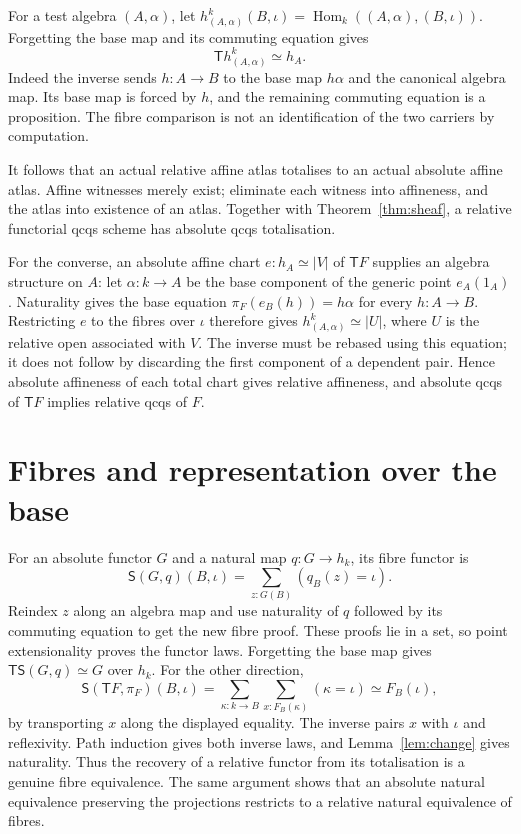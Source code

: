 \documentclass[11pt]{amsart}
\theoremstyle{definition}\newtheorem{definition}[theorem]{Definition}
\newcommand{\Hom}{\operatorname{Hom}}
\begin{document}
For a test algebra $(A,\alpha)$, let
$h^k_{(A,\alpha)}(B,\iota)=\Hom_k((A,\alpha),(B,\iota))$.
Forgetting the base map and its commuting equation gives
\begin{equation}\label{eq:affine}
 \mathsf T h^k_{(A,\alpha)}\simeq h_A.
\end{equation}
Indeed the inverse sends $h:A\to B$ to the base map $h\alpha$ and
the canonical algebra map. Its base map is forced by $h$, and the
remaining commuting equation is a proposition. The fibre comparison is
not an identification of the two carriers by computation.

It follows that an actual relative affine atlas totalises to an actual
absolute affine atlas. Affine witnesses merely exist; eliminate each
witness into affineness, and the atlas into existence of an atlas.
Together with Theorem~\ref{thm:sheaf}, a relative functorial qcqs scheme
has absolute qcqs totalisation.

For the converse, an absolute affine chart $e:h_A\simeq|V|$ of
$\mathsf T F$ supplies an algebra structure on $A$: let $\alpha:k\to A$
be the base component of the generic point $e_A(1_A)$.
Naturality gives the base equation
$\pi_F(e_B(h))=h\alpha$ for every $h:A\to B$.
Restricting $e$ to the fibres over $\iota$ therefore gives
$h^k_{(A,\alpha)}\simeq|U|$, where $U$ is the relative open associated
with $V$. The inverse must be rebased using this equation; it does not
follow by discarding the first component of a dependent pair.
Hence absolute affineness of each total chart gives relative affineness,
and absolute qcqs of $\mathsf T F$ implies relative qcqs of $F$.

\section{Fibres and representation over the base}
For an absolute functor $G$ and a natural map $q:G\to h_k$, its fibre
functor is
\[
 \mathsf S(G,q)(B,\iota)=\sum_{z:G(B)}(q_B(z)=\iota).
\]
Reindex $z$ along an algebra map and use naturality of $q$ followed by
its commuting equation to get the new fibre proof. These proofs lie in
a set, so point extensionality proves the functor laws. Forgetting the
base map gives $\mathsf T\mathsf S(G,q)\simeq G$ over $h_k$.
For the other direction,
\[
 \mathsf S(\mathsf T F,\pi_F)(B,\iota)
   =\sum_{\kappa:k\to B}\sum_{x:F_B(\kappa)}(\kappa=\iota)
   \simeq F_B(\iota),
\]
by transporting $x$ along the displayed equality. The inverse pairs
$x$ with $\iota$ and reflexivity. Path induction gives both inverse laws,
and Lemma~\ref{lem:change} gives naturality. Thus the recovery of a
relative functor from its totalisation is a genuine fibre equivalence.
The same argument shows that an absolute natural equivalence preserving
the projections restricts to a relative natural equivalence of fibres.
\end{document}
